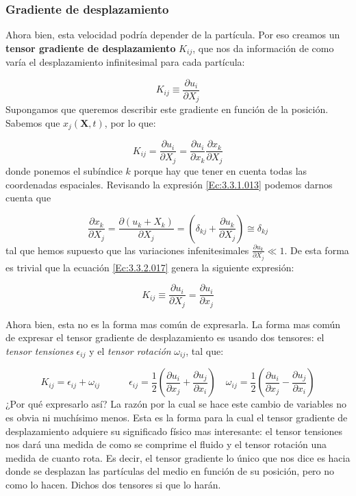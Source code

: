 \documentclass[12pt,a4paper]{article}
\numberwithin{equation}{section}
\numberwithin{figure}{section}
\newcommand{\parentesis}[1]{\left( #1  \right)}
\newcommand{\parciales}[2]{\frac{\partial #1}{\partial #2}}
\newcommand{\tquad}{\quad \quad \quad}
\newcommand{\Xn}{\mathbf{X}}
\begin{document}
\subsubsection{Gradiente de desplazamiento}

Ahora bien, esta velocidad podría depender de la partícula. Por eso creamos un \textbf{tensor gradiente de desplazamiento} $K_{ij}$, que nos da información de como varía el desplazamiento infinitesimal para cada partícula:

\begin{equation}
K_{ij} \equiv \parciales{u_i}{X_j}
\end{equation}
Supongamos que queremos describir este gradiente en función de la posición. Sabemos que $x_j (\Xn,t)$, por lo que:

\begin{equation}
K_{ij} = \parciales{u_i}{X_j} =\parciales{u_i}{x_k} \parciales{x_k}{X_j}   \label{Ec:3.3.2.017}
\end{equation}
donde ponemos el subíndice $k$ porque hay que tener en cuenta todas las coordenadas espaciales. Revisando la expresión \ref{Ec:3.3.1.013} podemos darnos cuenta que

\begin{equation}
\parciales{x_k}{X_j } = \parciales{(u_k + X_k)}{X_j} = \parentesis{\delta_{kj} + \parciales{u_k}{X_j}} \cong \delta_{kj}
\end{equation}
tal que hemos supuesto que las variaciones infenitesimales $\parciales{u_k}{X_j} \ll 1$. De esta forma es trivial que la ecuación \ref{Ec:3.3.2.017} genera la siguiente expresión:

\begin{equation}
K_{ij} \equiv \parciales{u_i}{X_j} = \parciales{u_i}{x_j}
\end{equation}

Ahora bien, esta no es la forma mas común de expresarla. La forma mas común de expresar el tensor gradiente de desplazamiento es usando dos tensores: el \textit{tensor tensiones} $\epsilon_{ij}$ y el \textit{tensor rotación} $\omega_{ij}$, tal que:

\begin{equation}
K_{ij} = \epsilon_{ij} + \omega_{ij} \tquad \epsilon_{ij} = \dfrac{1}{2} \parentesis{\parciales{u_i}{x_j} + \parciales{u_j}{x_i}}  \quad \omega_{ij} = \dfrac{1}{2}  \parentesis{\parciales{u_i}{x_j} - \parciales{u_j}{x_i}}
\end{equation}
¿Por qué expresarlo así? La razón por la cual se hace este cambio de variables no es obvia ni muchísimo menos. Esta es la forma para la cual el tensor gradiente de desplazamiento adquiere su significado físico mas interesante: el tensor tensiones nos dará una medida de como se comprime el fluido y el tensor rotación una medida de cuanto rota. Es decir, el tensor gradiente lo único que nos dice es hacia donde se desplazan las partículas del medio en función de su posición, pero no como lo hacen. Dichos dos tensores si que lo harán.  
\end{document}

